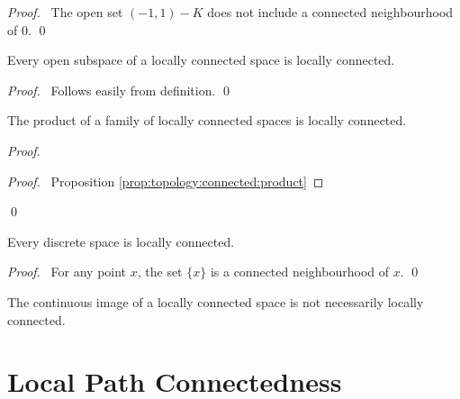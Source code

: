 \begin{proof}
\pf\ The open set $(-1,1) - K$ does not include a connected neighbourhood of
0. \qed
\end{proof}

\begin{prop}
Every open subspace of a locally connected space is locally connected.
\end{prop}

\begin{proof}
\pf\ Follows easily from definition. \qed
\end{proof}

\begin{prop}[AC]
The product of a family of locally connected spaces is locally connected.
\end{prop}

\begin{proof}
\pf
{}
\begin{proof}
  \pf\ Proposition \ref{prop:topology:connected:product}
\end{proof}
\qed
\end{proof}

\begin{prop}
Every discrete space is locally connected.
\end{prop}

\begin{proof}
\pf\ For any point $x$, the set $\{x\}$ is a connected neighbourhood of $x$. \qed
\end{proof}

\begin{cor}
The continuous image of a locally connected space is not necessarily locally connected.
\end{cor}

\section{Local Path Connectedness}

